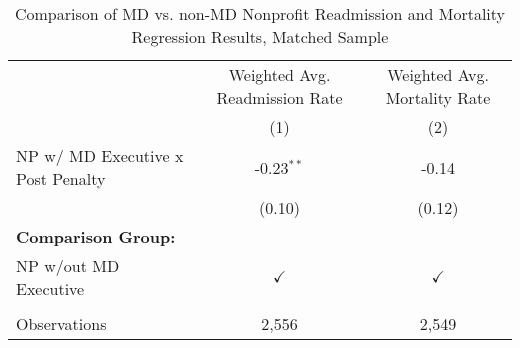 \begin{table}[htbp]
   \caption{\label{tab:MD_noMD_matchsample} Comparison of MD vs. non-MD Nonprofit Readmission and Mortality Regression Results, Matched Sample}
   \bigskip
   \centering
   \begin{tabular}{lcc}
      \toprule
                                        & Weighted Avg. Readmission Rate & Weighted Avg. Mortality Rate\\  
                                        & (1)                            & (2)\\  
      \midrule 
      NP w/ MD Executive x Post Penalty & -0.23$^{**}$                   & -0.14\\   
                                        & (0.10)                         & (0.12)\\   
      \textbf{Comparison Group:}        &                                & \\  
      NP w/out MD Executive             & $\checkmark$                   & $\checkmark$\\   
       \\
      Observations                      & 2,556                          & 2,549\\  
      \bottomrule
   \end{tabular}
\end{table}
